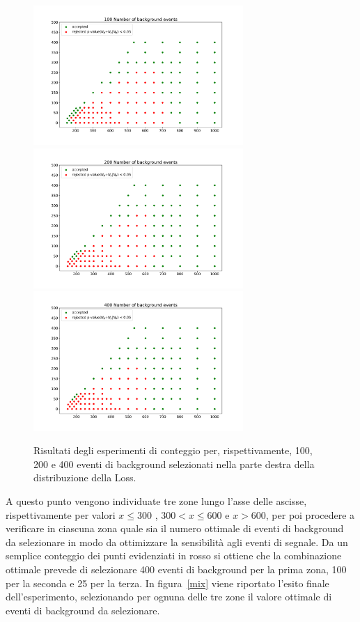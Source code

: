 \begin{figure}[h!]
	\centering
	\includegraphics[width=0.71\textwidth]{figs/risultati_simulazione/100.pdf}
	\includegraphics[width=0.71\textwidth]{figs/risultati_simulazione/200.pdf}
	\includegraphics[width=0.71\textwidth]{figs/risultati_simulazione/400.pdf}
	\caption{Risultati degli esperimenti di conteggio per, rispettivamente, 100, 200 e 400 eventi di background selezionati nella parte destra della distribuzione della Loss.}
	\label{test-100-200-400}
\end{figure}

A questo punto vengono individuate tre zone lungo l'asse delle ascisse, rispettivamente per valori $ x \le 300$ , $300 < x \le 600$ e $x > 600$, per poi procedere a verificare in ciascuna zona quale sia il numero ottimale di eventi di background da selezionare in modo da ottimizzare la sensibilità agli eventi di segnale. Da un semplice conteggio dei punti evidenziati in rosso si ottiene che la combinazione ottimale prevede di selezionare 400 eventi di background per la prima zona, 100 per la seconda e 25 per la terza. In figura~\ref{mix} viene riportato l'esito finale dell'esperimento, selezionando per ognuna delle tre zone il valore ottimale di eventi di background da selezionare.

